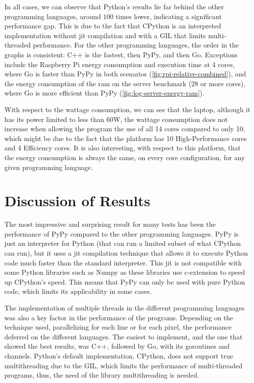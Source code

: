 In all cases, we can observe that Python's results lie far behind the other programming languages, around $100$ times lower, indicating a significant performance gap. This is due to the fact that \gls{CPython} is an interpreted implementation without \gls{jit} compilation and with a \gls{GIL} that limits multi-threaded performance. For the other programming languages, the order in the graphs is consistent: C++ is the fastest, then PyPy, and then Go. Exceptions include the Raspberry Pi energy consumption and execution time at 4 cores, where Go is faster than PyPy in both scenarios (\autoref{fig:rpi-relative-combined}), and the energy consumption of the \gls{ram} on the server benchmark (28 or more cores), where Go is more efficient than PyPy (\autoref{fig:log-server-energy-ram}).

With respect to the wattage consumption, we can see that the laptop, although it has its power limited to less than 60W, the wattage consumption does not increase when allowing the program the use of all 14 cores compared to only 10, which might be due to the fact that the platform has 10 High-Performance cores and 4 Efficiency cores. It is also interesting, with respect to this platform, that the energy consumption is always the same, on every core configuration, for any given programming language.



\section{Discussion of Results}

The most impressive and surprising result for many tests has been the performance of PyPy compared to the other programming languages. PyPy is just an interpreter for Python (that can run a limited subset of what \gls{CPython} can run), but it uses a \gls{jit} compilation technique that allows it to execute Python code much faster than the standard interpreter. This \gls{jit} is not compatible with some Python libraries such as Numpy \cite{numpy} as these libraries use \gls{c-extension} to speed up \gls{CPython}'s speed. This means that PyPy can only be used with pure Python code, which limits its applicability in some cases.

The implementation of multiple threads in the different programming languages was also a key factor in the performance of the programs. Depending on the technique used, parallelizing for each line or for each pixel, the performance deferred on the different languages. The easiest to implement, and the one that showed the best results, was C++, followed by Go, with its \glspl{goroutine} and \glspl{channel}. Python's default implementation, \gls{CPython}, does not support true multithreading due to the \gls{GIL}, which limits the performance of multi-threaded programs, thus, the need of the library multithreading is needed.



